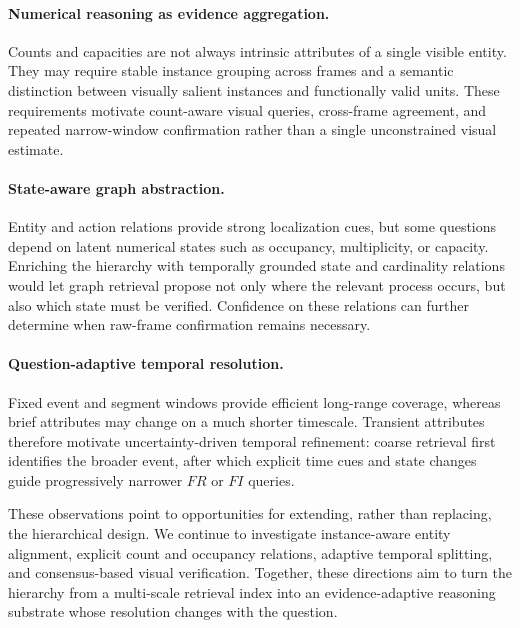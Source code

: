 \documentclass[11pt]{article}
\begin{document}
\paragraph{Numerical reasoning as evidence aggregation.}
Counts and capacities are not always intrinsic attributes of a single visible entity.
They may require stable instance grouping across frames and a semantic distinction between visually salient instances and functionally valid units.
These requirements motivate count-aware visual queries, cross-frame agreement, and repeated narrow-window confirmation rather than a single unconstrained visual estimate.

\paragraph{State-aware graph abstraction.}
Entity and action relations provide strong localization cues, but some questions depend on latent numerical states such as occupancy, multiplicity, or capacity.
Enriching the hierarchy with temporally grounded state and cardinality relations would let graph retrieval propose not only where the relevant process occurs, but also which state must be verified.
Confidence on these relations can further determine when raw-frame confirmation remains necessary.

\paragraph{Question-adaptive temporal resolution.}
Fixed event and segment windows provide efficient long-range coverage, whereas brief attributes may change on a much shorter timescale.
Transient attributes therefore motivate uncertainty-driven temporal refinement: coarse retrieval first identifies the broader event, after which explicit time cues and state changes guide progressively narrower $FR$ or $FI$ queries.

These observations point to opportunities for extending, rather than replacing, the hierarchical design.
We continue to investigate instance-aware entity alignment, explicit count and occupancy relations, adaptive temporal splitting, and consensus-based visual verification.
Together, these directions aim to turn the hierarchy from a multi-scale retrieval index into an evidence-adaptive reasoning substrate whose resolution changes with the question.
\end{document}
